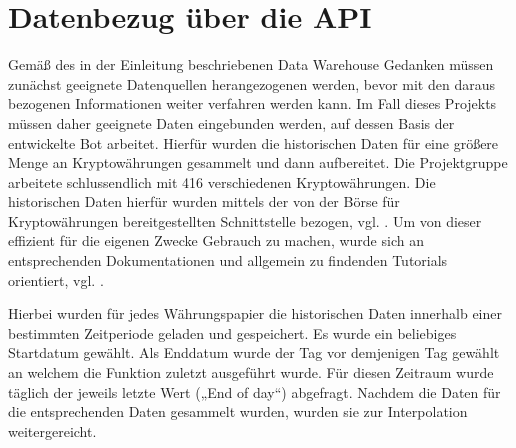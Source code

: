 \section{Datenbezug über die API}

Gemäß des in der Einleitung beschriebenen Data Warehouse Gedanken müssen zunächst geeignete Datenquellen herangezogenen werden, bevor mit den daraus bezogenen Informationen weiter verfahren werden kann. Im Fall dieses Projekts müssen daher geeignete Daten eingebunden werden, auf dessen Basis der entwickelte Bot arbeitet. Hierfür wurden die historischen Daten für eine größere Menge an Kryptowährungen gesammelt und dann aufbereitet. Die Projektgruppe arbeitete schlussendlich mit 416 verschiedenen Kryptowährungen. Die historischen Daten hierfür wurden mittels der von der Börse für Kryptowährungen bereitgestellten Schnittstelle bezogen, vgl. \cite{bitfinex}. Um von dieser effizient für die eigenen Zwecke Gebrauch zu machen, wurde sich an entsprechenden Dokumentationen und allgemein zu findenden Tutorials orientiert, vgl. \cite{kaggle}.

Hierbei wurden für jedes Währungspapier die historischen Daten innerhalb einer bestimmten Zeitperiode geladen und gespeichert. Es wurde ein beliebiges Startdatum gewählt. Als Enddatum wurde der Tag vor demjenigen Tag gewählt an welchem die Funktion zuletzt ausgeführt wurde. Für diesen Zeitraum wurde täglich der jeweils letzte Wert („End of day“) abgefragt. Nachdem die Daten für die entsprechenden Daten gesammelt wurden, wurden sie zur Interpolation weitergereicht.